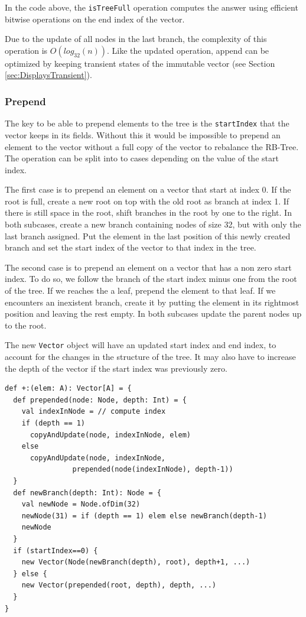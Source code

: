 In the code above, the \texttt{isTreeFull} operation computes the answer using efficient bitwise operations on the end index of the vector.

Due to the update of all nodes in the last branch, the complexity of this operation is $O(log_{32}(n))$. Like the updated operation, append can be optimized by keeping transient states of the immutable vector (see Section \ref{sec:DisplaysTransient}).

\subsubsection{Prepend}
The key to be able to prepend  elements to the tree is the \texttt{startIndex} that the vector keeps in its fields. Without this it would be impossible to prepend an element to the vector without a full copy of the vector to rebalance the RB-Tree. The operation can be split into to cases depending on the value of the start index.

The first case is to prepend an element on a vector that start at index 0. If the root is full, create a new root on top with the old root as branch at index 1. If there is still space in the root, shift branches in the root by one to the right. In both sub\-cases, create a new branch containing nodes of size 32, but with only the last branch assigned. Put the element in the last position of this newly created branch and set the start index of the vector to that index in the tree.

The second case is to prepend an element on a vector that has a non zero start index. To do so, we follow the branch of the start index minus one from the root of the tree. If we reaches the a leaf, prepend the element to that leaf. If we encounters an inexistent branch, create it by putting the element in its rightmost position and leaving the rest empty. In both sub\-cases update the parent nodes up to the root.

The new \texttt{Vector} object will have an updated start index and end index, to account for the changes in the structure of the tree. It may also have to increase the depth of the vector if the start index was previously zero. 

\begin{lstlisting}[frame=single]
def +:(elem: A): Vector[A] = {
  def prepended(node: Node, depth: Int) = {
    val indexInNode = // compute index
    if (depth == 1) 
      copyAndUpdate(node, indexInNode, elem)
    else 
      copyAndUpdate(node, indexInNode, 
                prepended(node(indexInNode), depth-1))
  }
  def newBranch(depth: Int): Node = {
    val newNode = Node.ofDim(32)
    newNode(31) = if (depth == 1) elem else newBranch(depth-1)
    newNode
  }
  if (startIndex==0) {
    new Vector(Node(newBranch(depth), root), depth+1, ...)
  } else {
    new Vector(prepended(root, depth), depth, ...)  
  }
}
\end{lstlisting}

